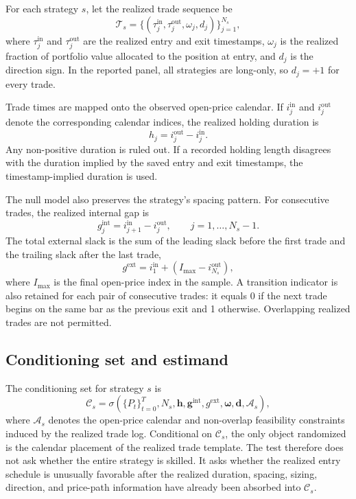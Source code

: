 \documentclass[risks,article,submit,pdftex,oneauthor]{Definitions/mdpi}
\begin{document}
For each strategy \(s\), let the realized trade sequence be
\begin{equation}
\mathcal{T}_s=\{(\tau^{\mathrm{in}}_j,\tau^{\mathrm{out}}_j,\omega_j,d_j)\}_{j=1}^{N_s},
\end{equation}
where \(\tau^{\mathrm{in}}_j\) and \(\tau^{\mathrm{out}}_j\) are the realized entry and exit timestamps, \(\omega_j\) is the realized fraction of portfolio value allocated to the position at entry, and \(d_j\) is the direction sign. In the reported panel, all strategies are long-only, so \(d_j=+1\) for every trade.

Trade times are mapped onto the observed open-price calendar. If \(i^{\mathrm{in}}_j\) and \(i^{\mathrm{out}}_j\) denote the corresponding calendar indices, the realized holding duration is
\begin{equation}
h_j=i^{\mathrm{out}}_j-i^{\mathrm{in}}_j.
\end{equation}
Any non-positive duration is ruled out. If a recorded holding length disagrees with the duration implied by the saved entry and exit timestamps, the timestamp-implied duration is used.

The null model also preserves the strategy's spacing pattern. For consecutive trades, the realized internal gap is
\begin{equation}
g^{\mathrm{int}}_j=i^{\mathrm{in}}_{j+1}-i^{\mathrm{out}}_j,\qquad j=1,\ldots,N_s-1.
\end{equation}
The total external slack is the sum of the leading slack before the first trade and the trailing slack after the last trade,
\begin{equation}
g^{\mathrm{ext}} = i^{\mathrm{in}}_1 + \left(I_{\max}-i^{\mathrm{out}}_{N_s}\right),
\end{equation}
where \(I_{\max}\) is the final open-price index in the sample. A transition indicator is also retained for each pair of consecutive trades: it equals 0 if the next trade begins on the same bar as the previous exit and 1 otherwise. Overlapping realized trades are not permitted.

\subsection{Conditioning set and estimand}
\label{sec:conditioning-estimand}

The conditioning set for strategy $s$ is
\[
\mathcal{C}_s =
\sigma\!\left(
\{P_t\}_{t=0}^{T},
N_s,
\mathbf{h},
\mathbf{g}^{\mathrm{int}},
g^{\mathrm{ext}},
\boldsymbol{\omega},
\mathbf{d},
\mathcal{A}_s
\right),
\]
where $\mathcal{A}_s$ denotes the open-price calendar and non-overlap feasibility constraints induced by the realized trade log. Conditional on $\mathcal{C}_s$, the only object randomized is the calendar placement of the realized trade template. The test therefore does not ask whether the entire strategy is skilled. It asks whether the realized entry schedule is unusually favorable after the realized duration, spacing, sizing, direction, and price-path information have already been absorbed into $\mathcal{C}_s$.
\end{document}
